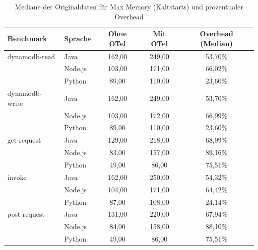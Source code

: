 \begin{table}[H]
\centering
\footnotesize
\caption{Mediane der Originaldaten für Max Memory (Kaltstarts) und prozentualer Overhead}
\label{app:raw-memory-cold}
\begin{tabular}{|l|l|c|c|c|}
\hline
\textbf{Benchmark} & \textbf{Sprache} & \textbf{Ohne OTel} & \textbf{Mit OTel} & \textbf{Overhead (Median)} \\
\hline
dynamodb-read   & Java    & 162,00 & 249,00 & 53,70\% \\
                & Node.js & 103,00 & 171,00 & 66,02\% \\
                & Python  &  89,00 & 110,00 & 23,60\% \\
\hline
dynamodb-write  & Java    & 162,00 & 249,00 & 53,70\% \\
                & Node.js & 103,00 & 172,00 & 66,99\% \\
                & Python  &  89,00 & 110,00 & 23,60\% \\
\hline
get-request     & Java    & 129,00 & 218,00 & 68,99\% \\
                & Node.js &  83,00 & 157,00 & 89,16\% \\
                & Python  &  49,00 &  86,00 & 75,51\% \\
\hline
invoke          & Java    & 162,00 & 250,00 & 54,32\% \\
                & Node.js & 104,00 & 171,00 & 64,42\% \\
                & Python  &  87,00 & 108,00 & 24,14\% \\
\hline
post-request    & Java    & 131,00 & 220,00 & 67,94\% \\
                & Node.js &  84,00 & 158,00 & 88,10\% \\
                & Python  &  49,00 &  86,00 & 75,51\% \\
\hline
\end{tabular}
\end{table}

